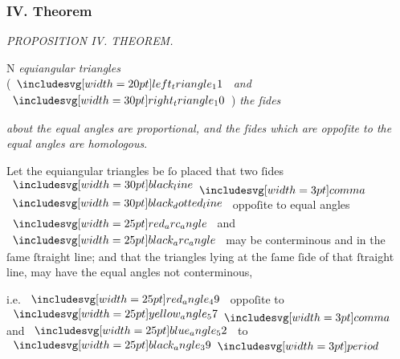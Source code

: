 \documentclass[11pt,preview]{standalone}
\begin{document}
\subsubsection{IV. Theorem}

\begin{minipage}[t]{0.43\textwidth}
    \vspace{20pt}
    
\end{minipage}%
\hfill
\begin{minipage}[t]{0.54\textwidth}
    \begin{center}
        \textit{PROPOSITION IV. THEOREM.}\label{book6pr4} \\
    \end{center}

    \hfill

    \begin{center}
        \raggedright \lettrine[lines=3, loversize=1, nindent=0pt]{}{}N \textit{equiangular triangles}\\ (\hspace{-1ex}$\img[0][0][20]{left_triangle_11}$ \textit{and} $\img[0][0][30]{right_triangle_10}$\hspace{-1ex}) \textit{the ſides}
    \end{center}
    \vspace{2ex}
    \raggedright \textit{about the equal angles are proportional, and the ſides which are oppoſite to the equal angles are homologous}.
\end{minipage}

\hfill

\raggedright Let the equiangular triangles be ſo placed that two ſides $\blackline \bcomma$\\
$\dottedblackline$ oppoſite to equal angles $\img{red_arc_angle}$ and $\img{black_arc_angle}$ may be conterminous and in the ſame ſtraight line; and that the triangles lying at the ſame ſide of that ſtraight line, may have the equal angles not conterminous,

\begin{center}
    i.e. $\img{red_angle_49}$ oppoſite to $\img{yellow_angle_57} \bcomma$ and $\img{blue_angle_52}$ to $\img{black_angle_39} \bperiod$
\end{center}
\end{document}
